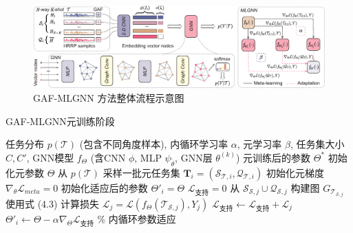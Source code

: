 \begin{figure}[h]
    \centering
    \includegraphics[width=\linewidth]{figures/method2.pdf}
    \caption{GAF-MLGNN 方法整体流程示意图}
    \label{fig:method_chap3}
\end{figure}

\begin{algorithm}[htbp]
\caption{GAF-MLGNN元训练阶段}
\label{alg:meta_training_angle}
\begin{algorithmic}[1]
    \REQUIRE 任务分布 $p(\mathcal{T})$ (包含不同角度样本), 内循环学习率 $\alpha$, 元学习率 $\beta$, 任务集大小 $C, C'$, GNN模型 $f_\Theta$ (含CNN $\phi$, MLP $\psi_{\tilde{\theta}}$, GNN层 $\theta^{(k)}$)
    \ENSURE 元训练后的参数 $\Theta^*$
    \STATE 初始化元参数 $\Theta$
        \STATE 从 $p(\mathcal{T})$ 采样一批元任务集 $\mathbf{T}_i = (\mathcal{S}_{\mathcal{T},i}, \mathcal{Q}_{\mathcal{T},i})$
        \STATE 初始化元梯度 $\nabla_\theta \mathcal{L}_{meta} = 0$
            \STATE 初始化适应后的参数 $\Theta'_i = \Theta$
            \STATE $\mathcal{L}_{支持} = 0$
               \STATE 从 $\mathcal{S}_{\mathcal{S},j} \cup \mathcal{Q}_{\mathcal{S},j}$ 构建图 $G_{\mathcal{T}_{\mathcal{S},j}}$
               \STATE 使用式 (4.3) 计算损失 $\mathcal{L}_j = \mathcal{L}(f_{\Theta}(\mathcal{T}_{\mathcal{S},j}), Y_j)$
               \STATE $\mathcal{L}_{支持} \leftarrow \mathcal{L}_{支持} + \mathcal{L}_j$
            \ENDFOR %
            \STATE $\Theta'_i \leftarrow \Theta - \alpha \nabla_{\Theta} \mathcal{L}_{支持}$ \% 内循环参数适应


\end{algorithmic}
\end{algorithm}
